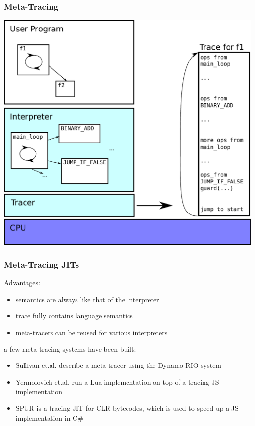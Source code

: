 \documentclass[utf8x]{beamer}
\begin{document}
\begin{frame}
  \frametitle{Meta-Tracing}
  \includegraphics[scale=0.5]{figures/metatrace01.pdf}
\end{frame}

\begin{frame}
  \frametitle{Meta-Tracing JITs}
  \begin{block}{Advantages:}
    \begin{itemize}
        \item semantics are always like that of the interpreter
        \item trace fully contains language semantics
        \item meta-tracers can be reused for various interpreters
    \end{itemize}
  \end{block}
  \pause
  a few meta-tracing systems have been built:
  \begin{itemize}
      \item Sullivan et.al. describe a meta-tracer using the Dynamo RIO system
      \item Yermolovich et.al. run a Lua implementation on top of a tracing JS implementation
      \item SPUR is a tracing JIT for CLR bytecodes, which is used to speed up a JS implementation in C\#
  \end{itemize}
\end{frame}
\end{document}
